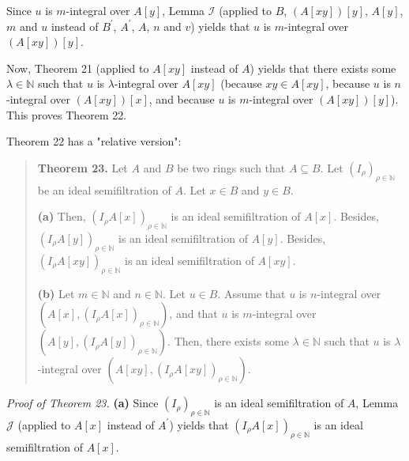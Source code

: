 \documentclass[12pt,final,notitlepage,onecolumn]{article}%
\begin{document}
Since $u$ is $m$-integral over $A\left[  y\right]  $, Lemma $\mathcal{I}$
(applied to $B$, $\left(  A\left[  xy\right]  \right)  \left[  y\right]  $,
$A\left[  y\right]  $, $m$ and $u$ instead of $B^{\prime}$, $A^{\prime}$, $A$,
$n$ and $v$) yields that $u$ is $m$-integral over $\left(  A\left[  xy\right]
\right)  \left[  y\right]  $.

Now, Theorem 21 (applied to $A\left[  xy\right]  $ instead of $A$) yields that
there exists some $\lambda\in\mathbb{N}$ such that $u$ is $\lambda$-integral
over $A\left[  xy\right]  $ (because $xy\in A\left[  xy\right]  $, because $u$
is $n$-integral over $\left(  A\left[  xy\right]  \right)  \left[  x\right]
$, and because $u$ is $m$-integral over $\left(  A\left[  xy\right]  \right)
\left[  y\right]  $). This proves Theorem 22.

Theorem 22 has a "relative version":

\begin{quote}
\textbf{Theorem 23.} Let $A$ and $B$ be two rings such that $A\subseteq B$.
Let $\left(  I_{\rho}\right)  _{\rho\in\mathbb{N}}$ be an ideal semifiltration
of $A$. Let $x\in B$ and $y\in B$.

\textbf{(a)} Then, $\left(  I_{\rho}A\left[  x\right]  \right)  _{\rho
\in\mathbb{N}}$ is an ideal semifiltration of $A\left[  x\right]  $. Besides,
$\left(  I_{\rho}A\left[  y\right]  \right)  _{\rho\in\mathbb{N}}$ is an ideal
semifiltration of $A\left[  y\right]  $. Besides, $\left(  I_{\rho}A\left[
xy\right]  \right)  _{\rho\in\mathbb{N}}$ is an ideal semifiltration of
$A\left[  xy\right]  $.

\textbf{(b)} Let $m\in\mathbb{N}$ and $n\in\mathbb{N}$. Let $u\in B$. Assume
that $u$ is $n$-integral over $\left(  A\left[  x\right]  ,\left(  I_{\rho
}A\left[  x\right]  \right)  _{\rho\in\mathbb{N}}\right)  $, and that $u$ is
$m$-integral over $\left(  A\left[  y\right]  ,\left(  I_{\rho}A\left[
y\right]  \right)  _{\rho\in\mathbb{N}}\right)  $. Then, there exists some
$\lambda\in\mathbb{N}$ such that $u$ is $\lambda$-integral over $\left(
A\left[  xy\right]  ,\left(  I_{\rho}A\left[  xy\right]  \right)  _{\rho
\in\mathbb{N}}\right)  $.
\end{quote}

\textit{Proof of Theorem 23.} \textbf{(a)} Since $\left(  I_{\rho}\right)
_{\rho\in\mathbb{N}}$ is an ideal semifiltration of $A$, Lemma $\mathcal{J}$
(applied to $A\left[  x\right]  $ instead of $A^{\prime}$) yields that
$\left(  I_{\rho}A\left[  x\right]  \right)  _{\rho\in\mathbb{N}}$ is an ideal
semifiltration of $A\left[  x\right]  $.
\end{document}
